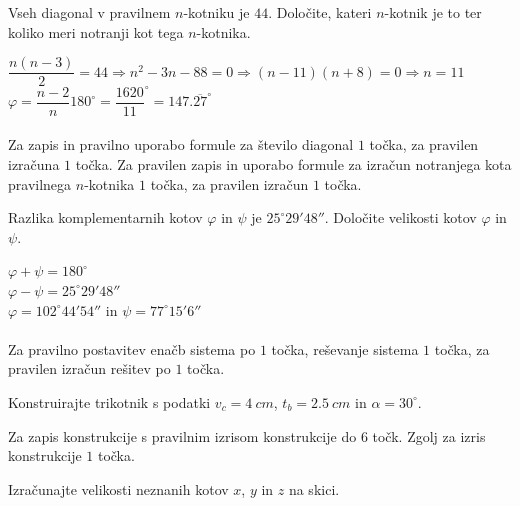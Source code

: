 \documentclass[addpoints]{exam}
\begin{document}
\begin{questions}


    \question[4]
    Vseh diagonal v pravilnem $n$-kotniku je $44$. Določite, kateri $n$-kotnik je to ter koliko meri notranji kot tega $n$-kotnika.

    \begin{solution}[6cm]
        $ \dfrac{n(n-3)}{2}=44 \Rightarrow n^2-3n-88=0 \Rightarrow (n-11)(n+8)=0 \Rightarrow n=11 $ \\
        $ \varphi=\dfrac{n-2}{n}180^\circ=\dfrac{1620}{11}^\circ=147.\overline{27}^\circ $ \\ \\
        Za zapis in pravilno uporabo formule za število diagonal $1$ točka, za pravilen izračuna $1$ točka. 
        Za pravilen zapis in uporabo formule za izračun notranjega kota pravilnega $n$-kotnika $1$ točka, za pravilen izračun $1$ točka.
    \end{solution}



    \question[5]
    Razlika komplementarnih kotov $\varphi$ in $\psi$ je $25^\circ 29' 48''$.
    Določite velikosti kotov $\varphi$ in $\psi$.

    \begin{solution}[5cm]
        $\varphi+\psi=180^\circ$ \\
        $\varphi-\psi=25^\circ 29' 48''$ \\
        $\varphi=102^\circ 44' 54''$ in $\psi=77^\circ 15' 6 ''$ \\ \\
        Za pravilno postavitev enačb sistema po $1$ točka, reševanje sistema $1$ točka, za pravilen izračun rešitev po $1$ točka.
    \end{solution}

    

    \newpage

    \question[6]
    Konstruirajte trikotnik s podatki $v_c=4~cm$, $t_b=2.5~cm$ in $\alpha=30^\circ$.

    \begin{solution}[15cm]
        Za zapis konstrukcije s pravilnim izrisom konstrukcije do $6$ točk. Zgolj za izris konstrukcije $1$ točka.
    \end{solution}




    \newpage

    \question[4]
    Izračunajte velikosti neznanih kotov $x$, $y$ in $z$ na skici.


\end{questions}
\end{document}
